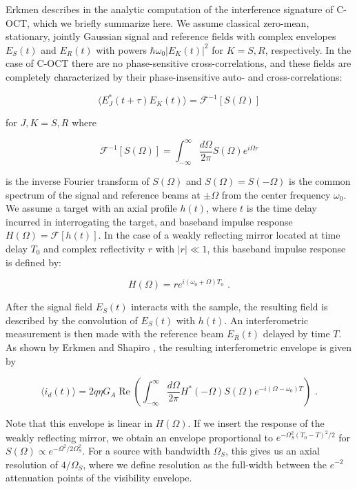 Erkmen describes in \cite{erkmen-thesis} the analytic computation of the interference signature of C-OCT, which we briefly summarize here. We assume classical zero-mean, stationary, jointly Gaussian signal and reference fields with complex envelopes $E_S(t)$ and $E_R(t)$ with powers $\hbar\omega_0|E_K(t)|^2$ for $K = S, R$, respectively. In the case of C-OCT there are no phase-sensitive cross-correlations, and these fields are completely characterized by their phase-insensitive auto- and cross-correlations:

\begin{equation}
\langle E_J^*(t+\tau) E_K(t) \rangle = \mathcal{F}^{-1}[S(\Omega)]
\end{equation}

for $J, K = S, R$ where

\begin{equation}
\mathcal{F}^{-1}[S(\Omega)] = \int_{-\infty}^{\infty} \frac{d\Omega}{2\pi} S(\Omega) e^{i \Omega r}
\end{equation}

is the inverse Fourier transform of $S(\Omega)$ and $S(\Omega) = S(-\Omega)$ is the common spectrum of the signal and reference beams at $\pm\Omega$ from the center frequency $\omega_0$. We assume a target with an axial profile $h(t)$, where $t$ is the time delay incurred in interrogating the target, and baseband impulse response $H(\Omega) = \mathcal{F}[h(t)]$. In the case of a weakly reflecting mirror located at time delay $T_0$ and complex reflectivity $r$ with $|r| \ll 1$, this baseband impulse response is defined by:

\begin{equation}
H(\Omega) = re^{i(\omega_0 + \Omega)T_0}\,\,.
\end{equation}

After the signal field $E_S(t)$ interacts with the sample, the resulting field is described by the convolution of $E_S(t)$ with $h(t)$. An interferometric measurement is then made with the reference beam $E_R(t)$ delayed by time $T$. As shown by Erkmen and Shapiro \cite{erkmen-pcoct}, the resulting interferometric envelope is given by

\begin{equation}
\langle i_d(t) \rangle = 2q\eta G_A \operatorname{Re}\left( \int_{-\infty}^{\infty} \frac{d\Omega}{2\pi} H^*(-\Omega) S(\Omega) e^{-i(\Omega-\omega_0)T}   \right)\,\,.
\end{equation}

Note that this envelope is linear in $H(\Omega)$. If we insert the response of the weakly reflecting mirror, we obtain an envelope proportional to $e^{-\Omega_S^2 (T_0 - T)^2 / 2}$ for $S(\Omega) \propto e^{-\Omega^2/2\Omega_S^2}$. For a source with bandwidth $\Omega_S$, this gives us an axial resolution of $4/\Omega_S$, where we define resolution as the full-width between the $e^{-2}$ attenuation points of the visibility envelope.

